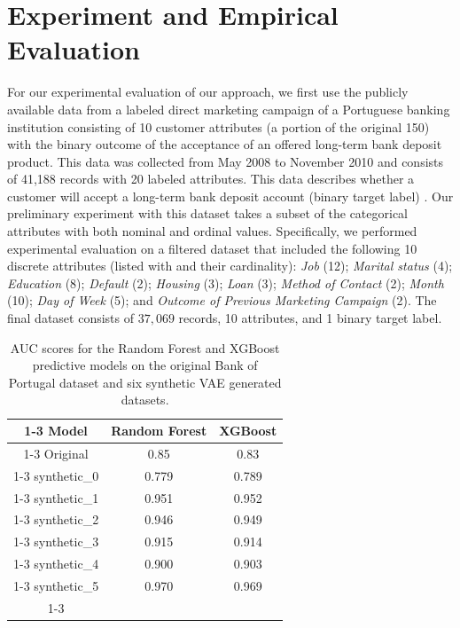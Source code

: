 \documentclass[dvipdft]{article}
\begin{document}
\section{Experiment and Empirical Evaluation}
\label{sec.results}

For our experimental evaluation of our approach, we first use the publicly available data from a labeled direct marketing campaign of a Portuguese banking institution consisting of 10 customer attributes (a portion of the original 150) with the binary outcome of the acceptance of an offered long-term bank deposit product. 
This data was collected from May 2008 to November 2010 and consists of 41,188 records with 20 labeled attributes. This data describes whether a customer will accept a long-term bank deposit account (binary target label) \cite{Moro2014}. 
Our preliminary experiment with this dataset takes a subset of the categorical attributes with both nominal and ordinal values. 
%
Specifically, we performed experimental evaluation on a filtered dataset that included the following 10 discrete attributes (listed with and their cardinality): \textit{Job} (12); \textit{Marital status} (4); \textit{Education} (8); \textit{Default} (2); \textit{Housing} (3); \textit{Loan} (3); \textit{Method of Contact} (2); \textit{Month} (10); \textit{Day of Week} (5); and \textit{Outcome of Previous Marketing Campaign} (2). The final dataset consists of $37,069$ records, 10 attributes, and 1 binary target label.

\begin{table}[ht]
\centering
\begin{tabular}{|c|c|c|}
\cline{1-3}
Model    & Random Forest    & XGBoost \\ \cline{1-3}
Original & 0.85  & 0.83   \\ \cline{1-3}
synthetic\_0 & 0.779 & 0.789  \\ \cline{1-3}
synthetic\_1 & 0.951 & 0.952   \\ \cline{1-3}
synthetic\_2 & 0.946 & 0.949   \\ \cline{1-3}
synthetic\_3 & 0.915 & 0.914   \\ \cline{1-3}
synthetic\_4 & 0.900 & 0.903   \\ \cline{1-3}
synthetic\_5 & 0.970 & 0.969   \\ \cline{1-3}
\end{tabular}
\caption{AUC scores for the Random Forest and XGBoost predictive models on the original Bank of Portugal dataset and six synthetic VAE generated datasets.}
\label{tab:AUCscores}%
\end{table}
\end{document}

